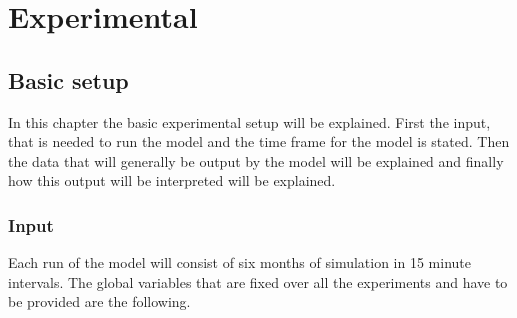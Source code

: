 \documentclass[a4paper]{article}
\begin{document}
\newpage

\section{Experimental}
\subsection{Basic setup}
In this chapter the basic experimental setup will be explained. First the input, that is needed to run the model 
and the time frame for the model is stated. Then the data that will generally be output by the model will be explained 
and finally how this output will be interpreted will be explained. 
\subsubsection{Input}
Each run of the model will consist of six months of simulation in 15 minute intervals. The global variables that are fixed
over all the experiments and have to be provided are the following. 
\end{document}
